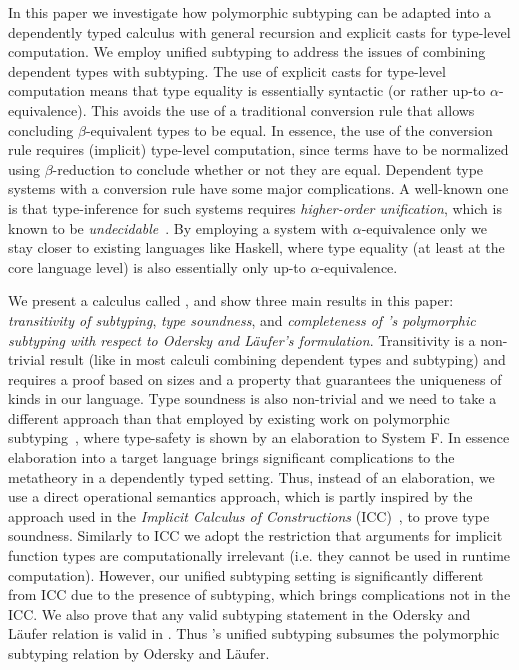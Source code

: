 In this paper we investigate how polymorphic subtyping can be
adapted into a dependently typed calculus with general recursion and
explicit casts for type-level computation. We employ unified subtyping
to address the issues of combining dependent types with subtyping.
The use of explicit casts
for type-level computation means that type equality is essentially
syntactic (or rather up-to $\alpha$-equivalence).
This avoids the use of a traditional conversion rule that allows concluding
$\beta$-equivalent types to be equal. In essence, the use of the conversion
rule requires (implicit) type-level computation, since terms have to be normalized
using $\beta$-reduction to conclude whether or not they are equal.
Dependent type systems with a conversion rule have some major complications.
A well-known one is that type-inference for such systems requires \emph{higher-order
  unification}, which is known to be \emph{undecidable}~\citep{goldfarb1981undecidability}.
By employing a system with $\alpha$-equivalence only we stay closer to existing
languages like Haskell, where type equality (at least at the core language level)
is also essentially only up-to $\alpha$-equivalence.

We present a calculus called \name, and show three main results in this paper:
\emph{transitivity of subtyping}, \emph{type soundness}, and \emph{completeness
of \name's polymorphic subtyping with respect to Odersky and L\"aufer's formulation}.
Transitivity is a non-trivial result (like in most calculi combining dependent types
and subtyping) and requires a proof based on sizes and a property that guarantees
the uniqueness of kinds in our language. Type soundness is also non-trivial and we need
to take a different approach than that employed by existing work on polymorphic
subtyping~\citep{odersky1996putting, jones2007practical}, where type-safety is shown by an
elaboration to System F. In essence elaboration into a target language
brings significant complications to the metatheory in a dependently typed setting.
Thus, instead of an elaboration, we use a direct operational semantics approach, which
is partly inspired by the approach used in the \emph{Implicit Calculus of Constructions} (ICC)~\citep{miquel2001implicit,barras2008implicit},
to prove type soundness.
Similarly to ICC we adopt the restriction that arguments for implicit function types
are computationally irrelevant (i.e. they cannot be used in runtime computation).
However, our unified subtyping setting is significantly
different from ICC due to the presence of subtyping,
which brings complications not in the ICC.
We also prove that any valid subtyping statement in the Odersky and L\"aufer relation
is valid in \name. Thus \name's unified subtyping subsumes the polymorphic subtyping
relation by Odersky and L\"aufer.

